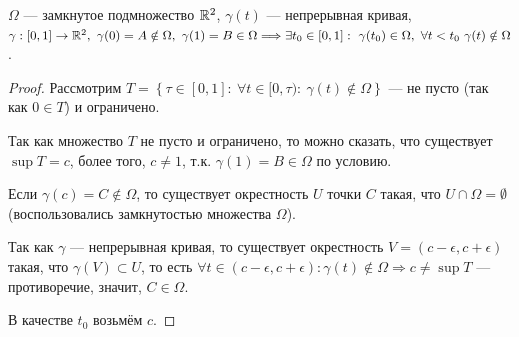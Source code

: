 \begin{lemma}
    $\Omega$ — замкнутое подмножество $\mathbb{R}^2$, $\gamma(t)$ — непрерывная кривая, $\gamma: [0,1] \to \R^2, \ \gamma(0) = A \notin \Omega, \ \gamma(1) = B \in \Omega \Longrightarrow \exists t_0 \in  [0,1]: \ \gamma(t_0) \in \Omega, \ \forall t < t_0 \ \gamma(t) \notin \Omega$.
\end{lemma}
\begin{proof}
    Рассмотрим $T = \left\{
        \tau \in [0,1]: \ \forall t \in [0, \tau): \ \gamma(t) \notin \Omega
    \right\}$ — не пусто (так как $0 \in T$) и ограничено.

    Так как множество $T$ не пусто и ограничено, то можно сказать, что существует $\sup{T} = c$, более того, $c \neq 1$, т.к. $\gamma(1) = B \in \Omega$ по условию.

    Если $\gamma(c) = C \notin \Omega$, то существует окрестность $U$ точки $C$ такая, что $U \cap \Omega = \emptyset$ (воспользовались замкнутостью множества $\Omega$).

    Так как $\gamma$ — непрерывная кривая, то существует окрестность $V = (c - \epsilon, c + \epsilon)$ такая, что $\gamma(V) \subset U$, то есть $\forall t \in (c - \epsilon, c + \epsilon): \gamma(t) \notin \Omega \Longrightarrow c \neq \sup{T}$ — противоречие, значит, $C \in \Omega$.
    
    В качестве $t_0$ возьмём $c$.

\end{proof}

